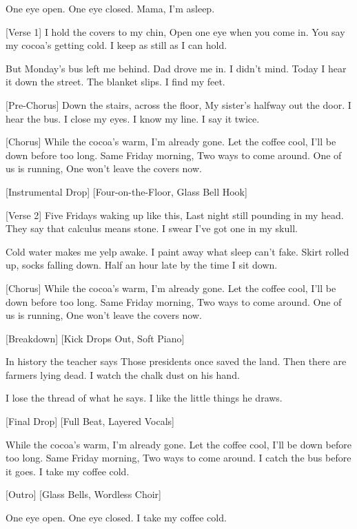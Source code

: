 \begin{lyrics}

One eye open.
One eye closed.
Mama, I’m asleep.

[Verse 1]
I hold the covers to my chin,
Open one eye when you come in.
You say my cocoa’s getting cold.
I keep as still as I can hold.

But Monday’s bus left me behind.
Dad drove me in. I didn’t mind.
Today I hear it down the street.
The blanket slips. I find my feet.

[Pre-Chorus]
Down the stairs, across the floor,
My sister’s halfway out the door.
I hear the bus. I close my eyes.
I know my line. I say it twice.

[Chorus]
While the cocoa’s warm,
I’m already gone.
Let the coffee cool,
I’ll be down before too long.
Same Friday morning,
Two ways to come around.
One of us is running,
One won’t leave the covers now.

[Instrumental Drop]
[Four-on-the-Floor, Glass Bell Hook]

[Verse 2]
Five Fridays waking up like this,
Last night still pounding in my head.
They say that calculus means stone.
I swear I’ve got one in my skull.

Cold water makes me yelp awake.
I paint away what sleep can’t fake.
Skirt rolled up, socks falling down.
Half an hour late by the time I sit down.

[Chorus]
While the cocoa’s warm,
I’m already gone.
Let the coffee cool,
I’ll be down before too long.
Same Friday morning,
Two ways to come around.
One of us is running,
One won’t leave the covers now.

[Breakdown]
[Kick Drops Out, Soft Piano]

In history the teacher says
Those presidents once saved the land.
Then there are farmers lying dead.
I watch the chalk dust on his hand.

I lose the thread of what he says.
I like the little things he draws.

[Final Drop]
[Full Beat, Layered Vocals]

While the cocoa’s warm,
I’m already gone.
Let the coffee cool,
I’ll be down before too long.
Same Friday morning,
Two ways to come around.
I catch the bus before it goes.
I take my coffee cold.

[Outro]
[Glass Bells, Wordless Choir]

One eye open.
One eye closed.
I take my coffee cold.
\end{lyrics}

